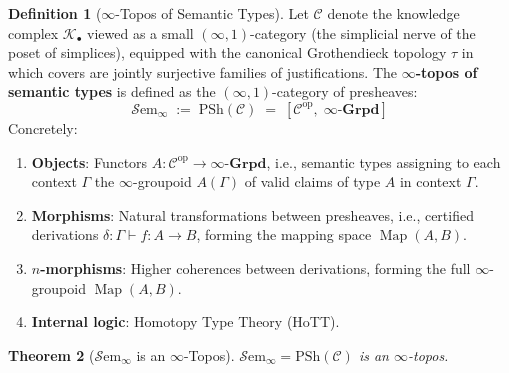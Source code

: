 \documentclass[11pt,a4paper]{article}
\theoremstyle{plain}
\newtheorem{theorem}{Theorem}[section]
\theoremstyle{definition}
\newtheorem{definition}[theorem]{Definition}
\theoremstyle{remark}
\newcommand{\Grpd}{\boldsymbol{\infty}\text{-}\mathbf{Grpd}}
\newcommand{\op}{\mathrm{op}}
\newcommand{\PSh}{\mathrm{PSh}}
\DeclareMathOperator{\Map}{Map}
\begin{document}
\begin{definition}[$\infty$-Topos of Semantic Types]\label{def:sem-topos}
Let $\mathcal{C}$ denote the knowledge complex $\mathcal{K}_\bullet$ viewed as a small $(\infty,1)$-category (the simplicial nerve of the poset of simplices), equipped with the canonical Grothendieck topology $\tau$ in which covers are jointly surjective families of justifications. The \textbf{$\infty$-topos of semantic types} is defined as the $(\infty,1)$-category of presheaves:
\[
\mathcal{S}\mathrm{em}_\infty \;:=\; \PSh(\mathcal{C}) \;=\; [\mathcal{C}^{\op},\; \Grpd]
\]
Concretely:
\begin{enumerate}[nosep]
  \item \textbf{Objects}: Functors $A\colon \mathcal{C}^{\op} \to \Grpd$, i.e., semantic types assigning to each context $\Gamma$ the $\infty$-groupoid $A(\Gamma)$ of valid claims of type $A$ in context $\Gamma$.
  \item \textbf{Morphisms}: Natural transformations between presheaves, i.e., certified derivations $\delta\colon \Gamma \vdash f : A \to B$, forming the mapping space $\Map(A, B)$.
  \item \textbf{$n$-morphisms}: Higher coherences between derivations, forming the full $\infty$-groupoid $\Map(A, B)$.
  \item \textbf{Internal logic}: Homotopy Type Theory (HoTT).
\end{enumerate}
\end{definition}

\begin{theorem}[$\mathcal{S}\mathrm{em}_\infty$ is an $\infty$-Topos]\label{thm:sem-topos}
$\mathcal{S}\mathrm{em}_\infty = \PSh(\mathcal{C})$ is an $\infty$-topos.
\end{theorem}
\end{document}
